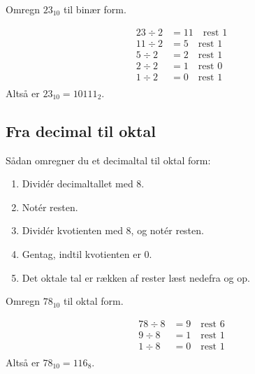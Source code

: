 \begin{example} Omregn \(23_{10}\) til binær form.

\begin{solution}

\[
\begin{aligned}
23 \div 2 & = 11 \quad \text{rest } 1 \\
11 \div 2 & = 5 \quad \text{rest } 1 \\
5 \div 2 & = 2 \quad \text{rest } 1 \\
2 \div 2 & = 1 \quad \text{rest } 0 \\
1 \div 2 & = 0 \quad \text{rest } 1 \\
\end{aligned}
\]
Altså er \(23_{10} = 10111_2\). \end{solution}
\end{example}

\subsection*{Fra decimal til oktal}
Sådan omregner du et decimaltal til oktal form:
\begin{enumerate}
    \item Dividér decimaltallet med 8.
    \item Notér resten.
    \item Dividér kvotienten med 8, og notér resten.
    \item Gentag, indtil kvotienten er 0.
    \item Det oktale tal er rækken af rester læst nedefra og op.
\end{enumerate}

\begin{example}Omregn \(78_{10}\) til oktal form.

\begin{solution}
    

\[
\begin{aligned}
78 \div 8 & = 9 \quad \text{rest } 6 \\
9 \div 8 & = 1 \quad \text{rest } 1 \\
1 \div 8 & = 0 \quad \text{rest } 1 \\
\end{aligned}
\]
Altså er \(78_{10} = 116_8\). \end{solution}
    
\end{example}

